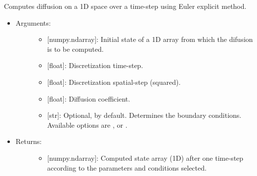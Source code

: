 \documentclass[letterpaper,10pt,english]{sphinxmanual}
\begin{document}
\begin{fulllineitems}
\label{\detokenize{diffusion:data_tools.diffusion.euler_explicit1D}}
Computes diffusion on a 1D space over a time-step using Euler
explicit method.
\begin{itemize}
\item {} \begin{description}
\item[{Arguments:}] \leavevmode\begin{itemize}
\item {} 
 {[}numpy.ndarray{]}: Initial state of a 1D array from which
the difusion is to be computed.

\item {} 
 {[}float{]}: Discretization time-step.

\item {} 
 {[}float{]}: Discretization spatial-step (squared).

\item {} 
 {[}float{]}: Diffusion coefficient.

\item {} 
 {[}str{]}: Optional,  by default. Determines
the boundary conditions. Available options are ,
 or .

\end{itemize}

\end{description}

\item {} \begin{description}
\item[{Returns:}] \leavevmode\begin{itemize}
\item {} 
{[}numpy.ndarray{]}: Computed state array (1D) after one time-step
according to the parameters and conditions selected.

\end{itemize}

\end{description}

\end{itemize}

\end{fulllineitems}
\end{document}
